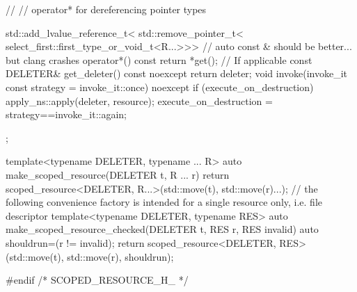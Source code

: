 \documentclass[ebook,11pt,article]{memoir}
\begin{document}
\begin{codeblock}
{	//
	// operator* for dereferencing pointer types

	std::add_lvalue_reference_t<
		std::remove_pointer_t<
			select_first::first_type_or_void_t<R...>>>
	// auto const \& should be better... but clang crashes
	operator*() const {
		return *get();		// If applicable
	}
	const DELETER& get_deleter() const noexcept {
		return deleter;
	}
	void invoke(invoke_it const strategy = invoke_it::once) noexcept {
		if (execute_on_destruction) {
			apply_ns::apply(deleter, resource);
		}
		execute_on_destruction = strategy==invoke_it::again;
	}
};

template<typename DELETER, typename ... R>
	auto make_scoped_resource(DELETER t, R ... r) {
	return scoped_resource<DELETER, R...>(std::move(t), std::move(r)...);
}
// the following convenience factory is intended for a single resource only, i.e. file descriptor
template<typename DELETER, typename RES>
auto make_scoped_resource_checked(DELETER t, RES r, RES invalid) {
	auto shouldrun=(r != invalid);
	return scoped_resource<DELETER, RES>(std::move(t), std::move(r), shouldrun);
}


#endif /* SCOPED_RESOURCE_H_ */
\end{codeblock}
\end{document}
